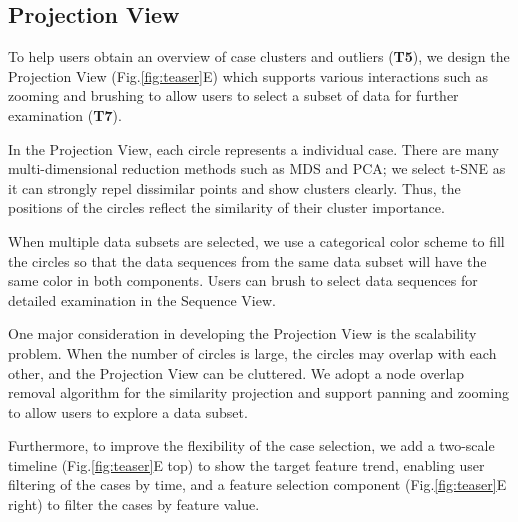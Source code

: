 \subsection{Projection View}
To help users obtain an overview of case clusters and outliers (\textbf{T5}), we design the Projection View (Fig.\ref{fig:teaser}E) which supports various interactions such as zooming and brushing to allow users to select a subset of data for further examination (\textbf{T7}). 

In the Projection View, each circle represents a individual case. There are many multi-dimensional reduction methods such as MDS and PCA; we select t-SNE as it can strongly repel dissimilar points and show clusters clearly.
Thus, the positions of the circles reflect the similarity of their cluster importance.

When multiple data subsets are selected, we use a categorical color scheme to fill the circles so that the data sequences from the same data subset will have the same color in both components.
Users can brush to select data sequences for detailed examination in the Sequence View.

One major consideration in developing the Projection View is the scalability problem.
When the number of circles is large, the circles may overlap with each other, and the Projection View can be cluttered.
We adopt a node overlap removal algorithm for the similarity projection and support panning and zooming to allow users to explore a data subset.

Furthermore, to improve the flexibility of the case selection, we add a two-scale timeline (Fig.\ref{fig:teaser}E top) to show the target feature trend, enabling user filtering of the  cases by time, and a feature selection component (Fig.\ref{fig:teaser}E right) to filter the cases by feature value.  

